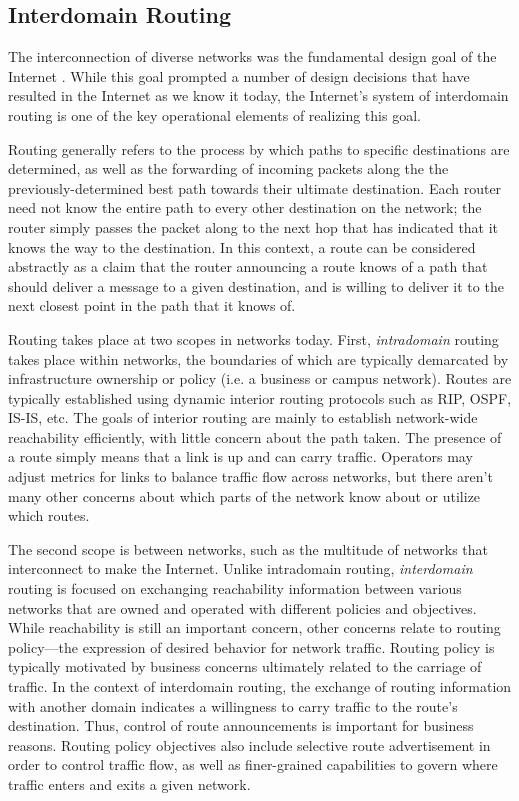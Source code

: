 \subsection{Interdomain Routing}

The interconnection of diverse networks was the fundamental design goal of the
Internet \cite{Clark:1988kl}. While this goal prompted a number of design
decisions that have resulted in the Internet as we know it today, the
Internet's system of interdomain routing is one of the key operational elements
of realizing this goal.

Routing generally refers to the process by which paths to specific destinations
are determined, as well as the forwarding of incoming packets along the the
previously-determined best path towards their ultimate destination. Each router
need not know the entire path to every other destination on the network; the
router simply passes the packet along to the next hop that has indicated that
it knows the way to the destination. In this context, a route can be considered
abstractly as a claim that the router announcing a route knows of a path that
should deliver a message to a given destination, and is willing to deliver it
to the next closest point in the path that it knows of.

Routing takes place at two scopes in networks today. First, \emph{intradomain}
routing takes place within networks, the boundaries of which are typically
demarcated by infrastructure ownership or policy (i.e. a business or campus
network). Routes are typically established using dynamic interior routing
protocols such as RIP, OSPF, IS-IS, etc. The goals of interior routing are
mainly to establish network-wide reachability efficiently, with little concern
about the path taken. The presence of a route simply means that a link is up
and can carry traffic. Operators may adjust metrics for links to balance
traffic flow across networks, but there aren't many other concerns about which
parts of the network know about or utilize which routes.

The second scope is between networks, such as the multitude of networks that
interconnect to make the Internet. Unlike intradomain routing,
\emph{interdomain} routing is focused on exchanging reachability information
between various networks that are owned and operated with different policies
and objectives. While reachability is still an important concern, other
concerns relate to routing policy---the expression of desired behavior for
network traffic. Routing policy is typically motivated by business concerns
ultimately related to the carriage of traffic. In the context of interdomain
routing, the exchange of routing information with another domain indicates a
willingness to carry traffic to the route's destination. Thus, control of route
announcements is important for business reasons. Routing policy objectives also
include selective route advertisement in order to control traffic flow, as well
as finer-grained capabilities to govern where traffic enters and exits a given
network.

